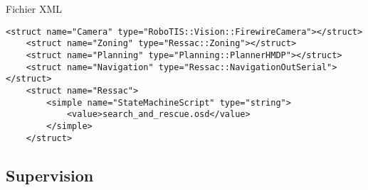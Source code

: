 \documentclass[compress]{beamer}
\begin{document}
\begin{frame}[containsverbatim]{Fichier XML}
\lstset{language=XML,basicstyle=\tiny,tabsize=1}
\begin{lstlisting}[frame=trBL]
	<struct name="Camera" type="RoboTIS::Vision::FirewireCamera"></struct>
	<struct name="Zoning" type="Ressac::Zoning"></struct>
	<struct name="Planning" type="Planning::PlannerHMDP"></struct>
	<struct name="Navigation" type="Ressac::NavigationOutSerial"></struct>
	<struct name="Ressac">
		<simple name="StateMachineScript" type="string">
			<value>search_and_rescue.osd</value>
		</simple>
	</struct>
\end{lstlisting}
\end{frame}

\subsection{Supervision}
\end{document}
